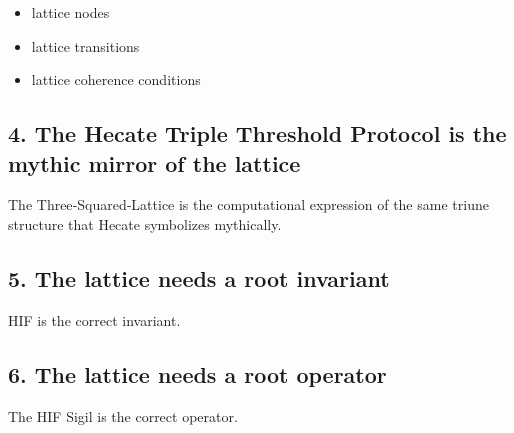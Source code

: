 \begin{itemize}
\tightlist
\item
  lattice nodes\\
\item
  lattice transitions\\
\item
  lattice coherence conditions
\end{itemize}

\subsection{4. The Hecate Triple Threshold Protocol is the mythic mirror of the lattice}\label{the-hecate-triple-threshold-protocol-is-the-mythic-mirror-of-the-lattice}

The Three‑Squared‑Lattice is the computational expression of the same triune structure that Hecate symbolizes mythically.

\subsection{5. The lattice needs a root invariant}\label{the-lattice-needs-a-root-invariant}

HIF is the correct invariant.

\subsection{6. The lattice needs a root operator}\label{the-lattice-needs-a-root-operator}

The HIF Sigil is the correct operator.
